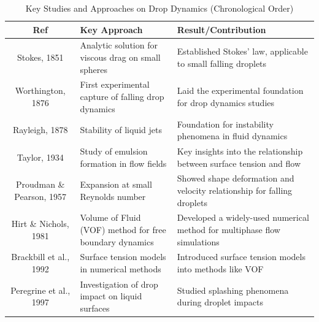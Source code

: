 \documentclass[12pt]{article}
\begin{document}
\begin{table}[htbp]
\scriptsize
\centering
\caption{Key Studies and Approaches on Drop Dynamics (Chronological Order)}
\renewcommand{\arraystretch}{1.2} %
\begin{tabularx}{\textwidth}{|c|X|X|}
\hline
\textbf{Ref}                 & \textbf{Key Approach}                                                 & \textbf{Result/Contribution}                                                            \\ \hline
Stokes, 1851\cite{stokes1851pendulums}                  & Analytic solution for viscous drag on small spheres                    & Established Stokes' law, applicable to small falling droplets                           \\ \hline
Worthington, 1876  \cite{worthington1876study}          & First experimental capture of falling drop dynamics                    & Laid the experimental foundation for drop dynamics studies                              \\ \hline
Rayleigh, 1878\cite{rayleigh1878stability}              & Stability of liquid jets                                               & Foundation for instability phenomena in fluid dynamics                                  \\ \hline
Taylor, 1934\cite{taylor1934emulsions}                 & Study of emulsion formation in flow fields                             & Key insights into the relationship between surface tension and flow                     \\ \hline
Proudman \& Pearson, 1957\cite{proudman1957expansion}    & Expansion at small Reynolds number                                     & Showed shape deformation and velocity relationship for falling droplets                 \\ \hline
Hirt \& Nichols, 1981\cite{hirt1981vof}        & Volume of Fluid (VOF) method for free boundary dynamics                & Developed a widely-used numerical method for multiphase flow simulations                \\ \hline
Brackbill et al., 1992\cite{brackbill1992surface}       & Surface tension models in numerical methods                            & Introduced surface tension models into methods like VOF                                 \\ \hline
Peregrine et al., 1997\cite{peregrine1997impact}       & Investigation of drop impact on liquid surfaces                        & Studied splashing phenomena during droplet impacts                                      \\ \hline

\end{tabularx}
\end{table}
\end{document}
